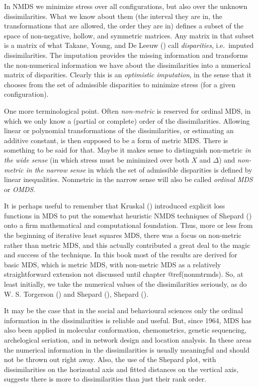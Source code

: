 \documentclass[
  12pt,
  letterpaper,
  DIV=11,
  numbers=noendperiod]{scrartcl}
\begin{document}
In NMDS we minimize stress over all configurations, but also over the
unknown dissimilarities. What we know about them (the interval they are
in, the transformations that are allowed, the order they are in) defines
a subset of the space of non-negative, hollow, and symmetric matrices.
Any matrix in that subset is a matrix of what Takane, Young, and De
Leeuw () call
\emph{disparities}, i.e.~imputed dissimilarities. The imputation
provides the missing information and transforms the non-numerical
information we have about the dissimilarities into a numerical matrix of
disparities. Clearly this is an \emph{optimistic imputation}, in the
sense that it chooses from the set of admissible disparities to minimize
stress (for a given configuration).

One more terminological point. Often \emph{non-metric} is reserved for
ordinal MDS, in which we only know a (partial or complete) order of the
dissimilarities. Allowing linear or polynomial transformations of the
dissimilarities, or estimating an additive constant, is then supposed to
be a form of metric MDS. There is something to be said for that. Maybe
it makes sense to distinguish non-metric \emph{in the wide sense} (in
which stress must be minimized over both \(X\) and \(\Delta\)) and
\emph{non-metric in the narrow sense} in which the set of admissible
disparities is defined by linear inequalities. Nonmetric in the narrow
sense will also be called \emph{ordinal MDS} or \emph{OMDS}.

It is perhaps useful to remember that Kruskal
() introduced explicit loss functions
in MDS to put the somewhat heuristic NMDS techniques of Shepard
() onto a firm mathematical and
computational foundation. Thus, more or less from the beginning of
iterative least squares MDS, there was a focus on non-metric rather than
metric MDS, and this actually contributed a great deal to the magic and
success of the technique. In this book most of the results are derived
for basic MDS, which is metric MDS, with non-metric MDS as a relatively
straightforward extension not discussed until chapter @ref(nonmtrmds).
So, at least initially, we take the numerical values of the
dissimilarities seriously, as do W. S. Torgerson
() and Shepard
(), Shepard
().

It may be the case that in the social and behavioural sciences only the
ordinal information in the dissimilarities is reliable and useful. But,
since 1964, MDS has also been applied in molecular conformation,
chemometrics, genetic sequencing, archelogical seriation, and in network
design and location analysis. In these areas the numerical information
in the dissimilarities is usually meaningful and should not be thrown
out right away. Also, the use of the Shepard plot, with dissimilarities
on the horizontal axis and fitted distances on the vertical axis,
suggests there is more to dissimilarities than just their rank order.
\end{document}
